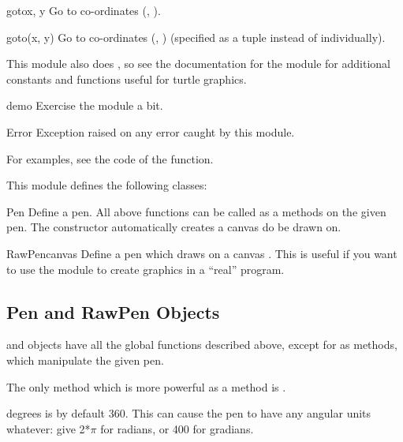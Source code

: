 \begin{funcdesc}{goto}{x, y}
Go to co-ordinates (, ).
\end{funcdesc}

\begin{funcdesc}{goto}{(x, y)}
Go to co-ordinates (, ) (specified as a tuple instead of 
individually).
\end{funcdesc}

This module also does , so see the
documentation for the  module for additional constants
and functions useful for turtle graphics.

\begin{funcdesc}{demo}{}
Exercise the module a bit.
\end{funcdesc}

\begin{excdesc}{Error}
Exception raised on any error caught by this module.
\end{excdesc}

For examples, see the code of the  function.

This module defines the following classes:

\begin{classdesc}{Pen}{}
Define a pen. All above functions can be called as a methods on the given
pen. The constructor automatically creates a canvas do be drawn on.
\end{classdesc}

\begin{classdesc}{RawPen}{canvas}
Define a pen which draws on a canvas . This is useful if 
you want to use the module to create graphics in a ``real'' program.
\end{classdesc}

\subsection{Pen and RawPen Objects \label{pen-rawpen-objects}}

 and  objects have all the global functions
described above, except for  as methods, which
manipulate the given pen.

The only method which is more powerful as a method is
.

\begin{methoddesc}{degrees}{}
 is by default 360. This can cause the pen to have any
angular units whatever: give  2*$\pi$ for radians, or
400 for gradians.
\end{methoddesc}
